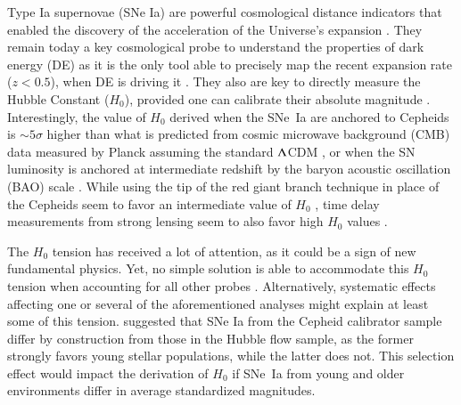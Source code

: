\documentclass[]{aa}
\begin{document}
Type Ia supernovae (SNe Ia) are powerful cosmological distance indicators that
enabled the discovery of the acceleration of the Universe's expansion
\citep{riess1998, perlmutter1999}. They remain today a key cosmological probe to
understand the properties of dark energy (DE) as it is the only tool able to
precisely map the recent expansion rate ($z<0.5$), when DE is driving it
\citep[e.g.][]{scolnicastro2020}. They also are key to directly measure the
Hubble Constant ($H_0$), provided one can calibrate their absolute magnitude
\citep{riess2016, freedman2019}. Interestingly, the value of $H_0$ derived when
the SNe~Ia are anchored to Cepheids \citep[the SH0ES
project,][]{riess2009, riess2016} is $\sim5\sigma$ higher than what is predicted
from cosmic microwave background (CMB) data measured by Planck assuming the
standard $\Lambda$CDM \citep{planck2018, riess2019, reid2019}, or when the SN
luminosity is anchored at intermediate redshift by the baryon acoustic
oscillation (BAO) scale \citep{feeney2019}. While using the tip of the red giant
branch technique in place of the Cepheids seem to favor an intermediate value of
$H_0$ \citep{freedman2019, freedman2020}, time delay measurements from strong
lensing seem to also favor high $H_0$ values \citep{wong2019}.

The $H_0$ tension has received a lot of attention, as it could be a sign of new
fundamental physics. Yet, no simple solution is able to accommodate this $H_0$
tension when accounting for all other probes \citep{knox2019}. Alternatively,
systematic effects affecting one or several of the aforementioned analyses
might explain at least some of this tension. \cite{rigault2015}
suggested that SNe Ia from the Cepheid calibrator sample differ by construction
from those in the Hubble flow sample, as the former strongly favors
young stellar populations, while the latter does not. This selection
effect would impact the derivation of $H_0$ if SNe~Ia from young and older
environments differ in average standardized magnitudes. 
\end{document}
